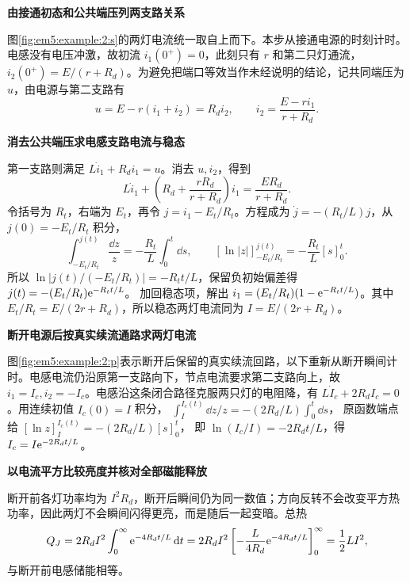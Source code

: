 \begin{solution}\textbf{由接通初态和公共端压列两支路关系}\par\nobreak
图\ref{fig:em5:example:2:s}的两灯电流统一取自上而下。本步从接通电源的时刻计时。电感没有电压冲激，故初流 $i_1(0^+)=0$，此刻只有 $r$ 和第二只灯通流，$i_2(0^+)=E/(r+R_d)$。为避免把端口等效当作未经说明的结论，记共同端压为 $u$，由电源与第二支路有
\[u=E-r(i_1+i_2)=R_di_2,\qquad i_2=\frac{E-ri_1}{r+R_d}.\]


\par\medskip{}\noindent\textbf{消去公共端压求电感支路电流与稳态}\par\nobreak
第一支路则满足 $L\dot i_1+R_di_1=u$。消去 $u,i_2$，得到
\[L\dot i_1+\left(R_d+\frac{rR_d}{r+R_d}\right)i_1=\frac{ER_d}{r+R_d}.\]
令括号为 $R_t$，右端为 $E_t$，再令 $j=i_1-E_t/R_t$。方程成为 $\dot j=-(R_t/L)j$，从 $j(0)=-E_t/R_t$ 积分，
\[
\int_{-E_t/R_t}^{j(t)}\frac{\dd z}{z}
 =-\frac{R_t}{L}\int_0^t\dd s,\qquad
 [\ln|z|]_{-E_t/R_t}^{j(t)}=-\frac{R_t}{L}[s]_0^t.
\]
所以 $\ln|j(t)/(-E_t/R_t)|=-R_tt/L$，保留负初始偏差得 $j(t)=-(E_t/R_t)\mathrm e^{-R_tt/L}$。
加回稳态项，解出 $i_1=(E_t/R_t)(1-\mathrm e^{-R_tt/L})$。其中 $E_t/R_t=E/(2r+R_d)$，所以稳态两灯电流同为 $I=E/(2r+R_d)$。



\par\medskip{}\noindent\textbf{断开电源后按真实续流通路求两灯电流}\par\nobreak
图\ref{fig:em5:example:2:p}表示断开后保留的真实续流回路，以下重新从断开瞬间计时。电感电流仍沿原第一支路向下，节点电流要求第二支路向上，故 $i_1=I_c,i_2=-I_c$。电感沿这条闭合路径克服两只灯的电阻降，有 $L\dot I_c+2R_dI_c=0$。用连续初值 $I_c(0)=I$ 积分，
$\int_I^{I_c(t)}\dd z/z=-(2R_d/L)\int_0^t\dd s$，
原函数端点给 $[\ln z]_I^{I_c(t)}=-(2R_d/L)[s]_0^t$，
即 $\ln(I_c/I)=-2R_dt/L$，得 $I_c=I\mathrm e^{-2R_dt/L}$。



\par\medskip{}\noindent\textbf{以电流平方比较亮度并核对全部磁能释放}\par\nobreak
断开前各灯功率均为 $I^2R_d$，断开后瞬间仍为同一数值；方向反转不会改变平方热功率，因此两灯不会瞬间闪得更亮，而是随后一起变暗。总热
\[
Q_J=2R_dI^2\int_0^\infty\mathrm e^{-4R_dt/L}\mathop{}\!\mathrm d t
=2R_dI^2\left[-\frac L{4R_d}\mathrm e^{-4R_dt/L}\right]_0^\infty
=\frac12LI^2,
\]与断开前电感储能相等。\end{solution}
